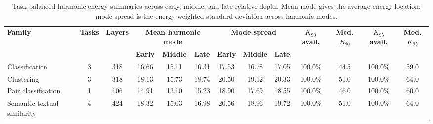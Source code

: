 \begin{table}[t]
\centering
\caption{Task-balanced harmonic-energy summaries across early, middle, and late relative depth. Mean mode gives the average energy location; mode spread is the energy-weighted standard deviation across harmonic modes.}
\label{tab:spectral_depth_summary}
\footnotesize
\setlength{\tabcolsep}{3.6pt}
\renewcommand{\arraystretch}{1.10}
\begin{tabular*}{\textwidth}{@{\extracolsep{\fill}}lcccccccccccc@{}}
\toprule
\textbf{Family} & \textbf{Tasks} & \textbf{Layers} & \multicolumn{3}{c}{\textbf{Mean harmonic mode}} & \multicolumn{3}{c}{\textbf{Mode spread}} & \textbf{$K_{90}$ avail.} & \textbf{Med. $K_{90}$} & \textbf{$K_{95}$ avail.} & \textbf{Med. $K_{95}$} \\
& & & \textbf{Early} & \textbf{Middle} & \textbf{Late} & \textbf{Early} & \textbf{Middle} & \textbf{Late} & & & & \\
\midrule
Classification & 3 & 318 & 16.66 & 15.11 & 16.31 & 17.53 & 16.78 & 17.05 & 100.0\% & 44.5 & 100.0\% & 59.0 \\
Clustering & 3 & 318 & 18.13 & 15.73 & 18.74 & 20.50 & 19.12 & 20.33 & 100.0\% & 51.0 & 100.0\% & 64.0 \\
Pair classification & 1 & 106 & 14.91 & 13.10 & 15.23 & 18.90 & 17.69 & 18.55 & 100.0\% & 46.0 & 100.0\% & 60.0 \\
Semantic textual similarity & 4 & 424 & 18.32 & 15.03 & 16.98 & 20.56 & 18.96 & 19.72 & 100.0\% & 51.0 & 100.0\% & 64.0 \\
\bottomrule
\end{tabular*}
\end{table}
